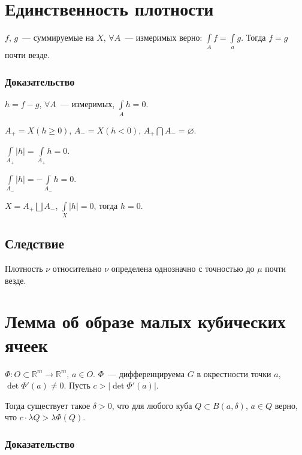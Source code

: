 \documentclass{article}
\begin{document}
    \newpage
    
    \section{Единственность плотности}
    
        $f$, $g$~--- суммируемые на $X$, $\forall A$~--- измеримых верно: $\int\limits_A f = \int\limits_a g$. Тогда $f = g$ почти везде.
        
        \subsubsection{Доказательство}
        
            $h = f - g$, $\forall A$~--- измеримых, $\int\limits_A h = 0$.
            
            $A_+ = X(h \geqslant 0)$, $A_- = X(h < 0)$, $A_+ \bigcap A_- = \varnothing$.
            
            $\int\limits_{A_+} |h| = \int\limits_{A_+} h = 0$.
            
            $\int\limits_{A_-} |h| = - \int\limits_{A_-} h = 0$.
            
            $X = A_+ \bigsqcup A_-$, $\int\limits_{X} |h| = 0$, тогда $h = 0$.
            
        \subsection{Следствие}
        
            Плотность $\nu$ относительно $\nu$ определена однозначно с точностью до $\mu$ почти везде.
    
    \newpage
        
    \section{Лемма об образе малых кубических ячеек}
    
        $\Phi : O \subset \mathbb{R}^m \rightarrow \mathbb{R}^m$, $a \in O$. $\Phi$~--- дифференцируема $G$ в окрестности точки $a$, $\det \Phi'(a) \neq 0$. Пусть $c > | \det \Phi'(a) |$. 
        
        Тогда существует такое $\delta > 0$, что для любого куба $Q \subset B(a, \delta)$, $a \in Q$ верно, что $c \cdot \lambda Q > \lambda \Phi(Q)$.
        
        \subsubsection{Доказательство}
        
\end{document}
